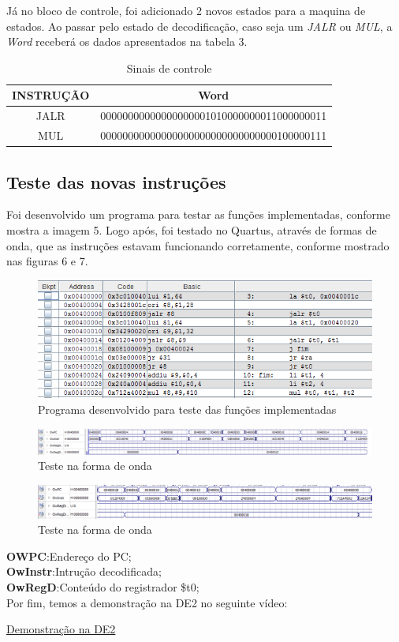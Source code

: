 \documentclass[12pt]{article}
\begin{document}
Já no bloco de controle, foi adicionado 2 novos estados para a maquina de estados. Ao passar pelo estado de decodificação, caso seja um \textit{JALR} ou \textit{MUL}, a \textit{Word} receberá os dados apresentados na tabela 3.

\begin{table}[H]
	\centering
	\begin{tabular}{|c|c|}
		\hline
		INSTRUÇÃO & Word \\\hline
		JALR & 00000000000000000001010000000011000000011 \\\hline
	    MUL  & 00000000000000000000000000000000100000111 \\\hline
	\end{tabular}
	\caption{Sinais de controle}
	\label{tab:mul}
\end{table}

\subsection{Teste das novas instruções}
\label{subsec:testeisa}

Foi desenvolvido um programa para testar as funções implementadas, conforme mostra a imagem 5. Logo após, foi testado no Quartus, através de formas de onda, que as instruções estavam funcionando corretamente, conforme mostrado nas figuras 6 e 7.   

\begin{figure}[H]
	\flushleft
	\includegraphics[width=1\textwidth]{programa.png}
	\caption{Programa desenvolvido para teste das funções implementadas}
	\label{fig:pest}
\end{figure}
\begin{figure}[H]
	\flushleft
	\includegraphics[width=1\textwidth]{teste.png}
	\caption{Teste na forma de onda}
	\label{fig:pest}
\end{figure}
\begin{figure}[H]
	\flushleft
	\includegraphics[width=1\textwidth]{images/teste1.png}
	\caption{Teste na forma de onda}
	\label{fig:pest}
\end{figure}


\textbf{OWPC}:Endereço do PC;\\
\textbf{OwInstr}:Intrução decodificada;\\
\textbf{OwRegD}:Conteúdo do registrador \$t0;\\



Por fim, temos a demonstração na DE2 no seguinte vídeo:

\href{https://youtu.be/aTrqM8m8FJc}{Demonstração na DE2}



\end{document}

